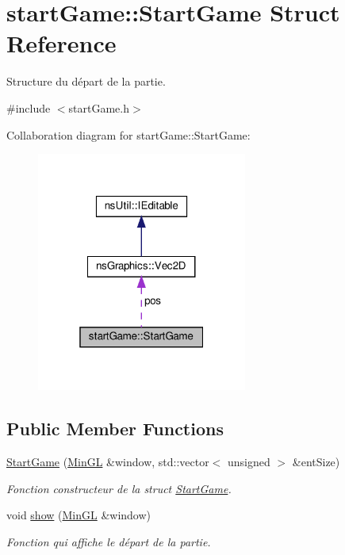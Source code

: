 \hypertarget{structstart_game_1_1_start_game}{}\section{start\+Game\+:\+:Start\+Game Struct Reference}
\label{structstart_game_1_1_start_game}


Structure du départ de la partie.  




{\ttfamily \#include $<$start\+Game.\+h$>$}



Collaboration diagram for start\+Game\+:\+:Start\+Game\+:
\nopagebreak
\begin{figure}[H]
\begin{center}
\leavevmode
\includegraphics[width=196pt]{structstart_game_1_1_start_game__coll__graph}
\end{center}
\end{figure}
\subsection*{Public Member Functions}
\begin{DoxyCompactItemize}
\item 
\hyperlink{structstart_game_1_1_start_game_a3d839835fe053e4a6357f98a70cdd71e}{Start\+Game} (\hyperlink{class_min_g_l}{Min\+GL} \&window, std\+::vector$<$ unsigned $>$ \&ent\+Size)
\begin{DoxyCompactList}\small\item\em Fonction constructeur de la struct \hyperlink{structstart_game_1_1_start_game}{Start\+Game}. \end{DoxyCompactList}\item 
void \hyperlink{structstart_game_1_1_start_game_a5607dba94483e55cc1855192063e4a58}{show} (\hyperlink{class_min_g_l}{Min\+GL} \&window)
\begin{DoxyCompactList}\small\item\em Fonction qui affiche le départ de la partie. \end{DoxyCompactList}\end{DoxyCompactItemize}
